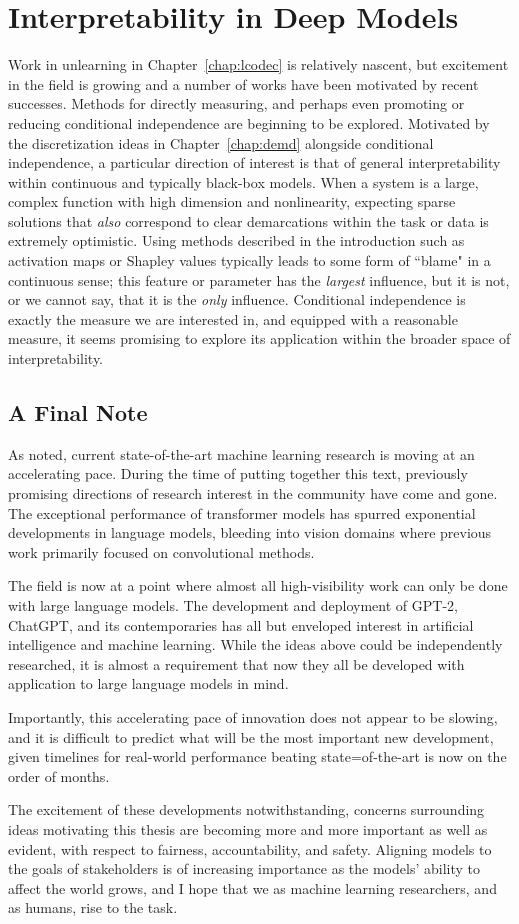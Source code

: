 \section{Interpretability in Deep Models}\label{sec:latents}
Work in unlearning in Chapter~\ref{chap:lcodec} is relatively nascent,
but excitement in the field is growing
and a number of works have been motivated
by recent successes.
Methods for directly measuring, and perhaps
even promoting or reducing conditional
independence are beginning to be explored.
Motivated by the discretization ideas
in Chapter~\ref{chap:demd} alongside
conditional independence,
a particular direction of interest
is that of general interpretability 
within continuous and typically
black-box models.
When a system is a large,
complex function with high dimension
and nonlinearity,
expecting sparse solutions
that \textit{also} correspond
to clear demarcations within the task or 
data is extremely optimistic.
Using methods described in the introduction
such as activation maps
or Shapley values typically 
leads to some form of ``blame"
in a continuous sense;
this feature or parameter
has the \textit{largest} influence,
but it is not, or we cannot say,
that it is the \textit{only} influence.
Conditional independence is exactly
the measure we are interested in,
and equipped with a reasonable measure,
it seems promising to explore its
application within the broader space of
interpretability.

\subsection{A Final Note}
As noted, current state-of-the-art
machine learning research
is moving at an accelerating pace.
During the time of putting
together this text,
previously promising directions
of research interest in the community
have come and gone.
The exceptional performance
of transformer models
has spurred exponential developments
in language models,
bleeding into vision domains
where previous work primarily
focused on convolutional methods.

The field is now at a point
where almost all high-visibility
work can only be done
with large language models.
The development and deployment
of GPT-2, ChatGPT, and its contemporaries
has all but enveloped interest
in artificial intelligence and machine learning.
While the ideas above could be independently
researched,
it is almost a requirement that now they 
all be developed with application to large
language models in mind.

Importantly, this accelerating pace
of innovation does not appear to be slowing,
and it is difficult to predict
what will be the most important
new development, given timelines
for real-world performance beating
state=of-the-art is now on the order of months.

The excitement of these developments notwithstanding,
concerns surrounding ideas motivating this thesis
are becoming more and more important as well
as evident, with respect to fairness,
accountability, and safety.
Aligning models to the goals of stakeholders
is of increasing importance as the models'
ability to affect the world grows,
and I hope that we as machine learning
researchers, and as humans, rise to the task.